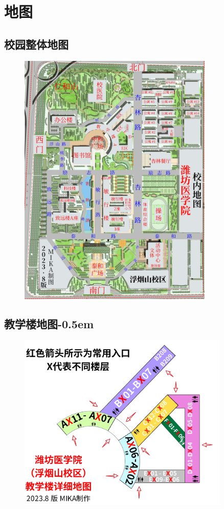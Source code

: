 \chapter[地图]{地图\vspace{-1em}}
\section[校园整体地图]{校园整体地图\vspace{-0.5em}}
\begin{figure}[ht]
    \centering
    \includegraphics*[width=0.83\textwidth]{地图_updated75.jpg}
\end{figure}

\newpage
\section[教学楼地图]{教学楼地图{-0.5em}}
\begin{figure}[ht]
    \centering
    \includegraphics*[width=0.9\textwidth]{教学楼.jpg}
\end{figure}


